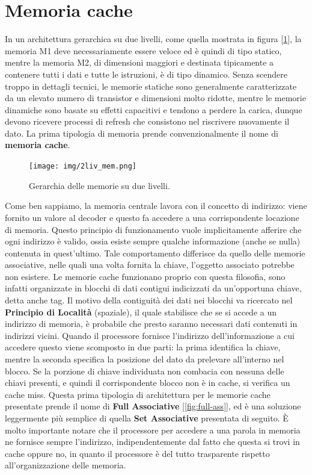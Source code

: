 \section{Memoria cache}
In un architettura gerarchica su due livelli, come quella mostrata in figura [\ref{fig:2livmem}], la memoria M1 deve necessariamente essere veloce ed è quindi di tipo statico, mentre la memoria M2, di dimensioni maggiori e destinata tipicamente a contenere tutti i dati e tutte le istruzioni, è di tipo dinamico. Senza scendere troppo in dettagli tecnici, le memorie statiche sono generalmente caratterizzate da un elevato numero di transistor e dimensioni molto ridotte, mentre le memorie dinamiche sono basate su effetti capacitivi e tendono a perdere la carica, dunque devono ricevere processi di refresh che consistono nel riscrivere nuovamente il dato. La prima tipologia di memoria prende convenzionalmente il nome di \textbf{memoria cache}.
\begin{figure}[!h]
    \centering
    \texttt{[image: img/2liv\_mem.png]}
    \caption{Gerarchia delle memorie su due livelli.}
    \label{fig:2livmem}
\end{figure}

Come ben sappiamo, la memoria centrale lavora con il concetto di indirizzo: viene fornito un valore al decoder e questo fa accedere a una corrispondente locazione di memoria. Questo principio di funzionamento vuole implicitamente afferire che ogni indirizzo è valido, ossia esiste sempre qualche informazione (anche se nulla) contenuta in quest'ultimo. Tale comportamento differisce da quello delle memorie associative, nelle quali una volta fornita la chiave, l'oggetto associato potrebbe non esistere. Le memorie cache funzionano proprio con questa filosofia, sono infatti organizzate in blocchi di dati contigui indicizzati da un'opportuna chiave, detta anche tag. Il motivo della contiguità dei dati nei blocchi va ricercato nel \textbf{Principio di Località} (spaziale), il quale stabilisce che se si accede a un indirizzo di memoria, è probabile che presto saranno necessari dati contenuti in indirizzi vicini. Quando il processore fornisce l'indirizzo dell'informazione a cui accedere questo viene scomposto in due parti: la prima identifica la chiave, mentre la seconda specifica la posizione del dato da prelevare all'interno nel blocco. Se la porzione di chiave individuata non combacia con nessuna delle chiavi presenti, e quindi il corrispondente blocco non è in cache, si verifica un cache miss. Questa prima tipologia di architettura per le memorie cache presentate prende il nome di \textbf{Full Associative} [\ref{fig:full-ass}], ed è una soluzione leggermente più semplice di quella \textbf{Set Associative} presentata di seguito. \MakeUppercase{è} molto importante notare che il processore per accedere a una parola in memoria ne fornisce sempre l'indirizzo, indipendentemente dal fatto che questa si trovi in cache oppure no, in quanto il processore è del tutto trasparente rispetto all'organizzazione delle memoria.

